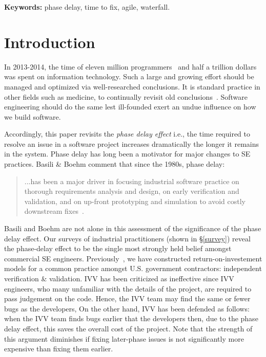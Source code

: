 \documentclass{sig-alternate}
\begin{document}
\vspace{1mm}
\noindent
{\bf Keywords:} phase delay, time to fix, agile, waterfall.

\section{Introduction}
In 2013-2014, the time of 
eleven  million programmers~\cite{pettey14} and
half a trillion dollars~\cite{avram14} was spent on information technology.
Such a large and growing effort should be managed and optimized via  well-researched conclusions.  
It is standard practice
in other fields such as medicine,
to continually revisit old conclusions~\cite{prasad13}. Software engineering should do the same lest
ill-founded  exert an undue influence on how we build software.  

Accordingly, this paper revisits
the {\em phase delay effect}
i.e.,  the time required to resolve an issue in a software project increases dramatically 
the longer it remains in the system. 
Phase delay has long been
a    motivator for major changes to
SE practices. Basili \& Boehm comment that since the 1980s,  phase delay:
\begin{quote}
...has been a major driver in focusing
industrial software practice on thorough
requirements analysis and design,
on early verification and validation, and
on up-front prototyping and simulation
to avoid costly downstream fixes~\cite{boehm01}.
\end{quote}
Basili and Boehm are not alone in this assessment of the significance of the phase delay effect. Our surveys of industrial practitioners (shown in \S\ref{survey}) reveal the phase-delay effect to be
the single most strongly held belief amongst commercial SE engineers.
Previously~\cite{me08a}, we have constructed return-on-investement models
for a common practice amongst U.S. government contractors: 
independent verification \& validation. IVV has been criticized as
ineffective since IVV engineers, who many  unfamiliar with the details of the project, are required to pass judgement on the code.
Hence,  the IVV team may find the same or fewer bugs
as the developers,
On the other hand, IVV has been defended
as follows:  when the IVV team finds bugs earlier that the developers then, due to the phase delay effect, this saves the overall cost of the project. Note that the strength of this argument diminishes
if fixing later-phase issues is not significantly more expensive than fixing them earlier. 
\end{document}
